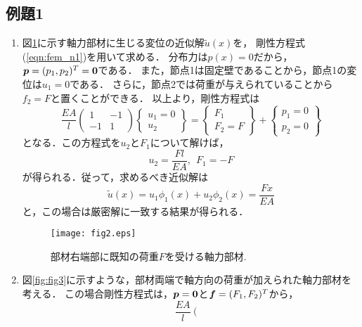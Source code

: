 \documentclass[10pt,a4j]{jarticle}
\begin{document}
\subsection{例題1}
\begin{enumerate}
\item
図\ref{fig:fig2}に示す軸力部材に生じる変位の近似解$\tilde u(x)$を，
剛性方程式(\ref{eqn:fem_n1})を用いて求める．
分布力は$p(x)=0$だから，$\mbox{\boldmath $p$}=(p_1,p_2)^T=\mbox{\boldmath $0$}$である．
また，節点1は固定壁であることから，節点1の変位は$u_1=0$である．
さらに，節点2では荷重が与えられていることから$f_2=F$と置くことができる．
以上より，剛性方程式は
\begin{equation}
	\frac{EA}{l}
	\left(
	\begin{array}{cc}
		1 & -1 \\
		-1 & 1
	\end{array}
	\right)
	\left\{
	\begin{array}{c}
		u_1=0 \\
		u_2
	\end{array}
	\right\}
	=
	\left\{
	\begin{array}{c}
		F_1\\
		F_2=F
	\end{array}
	\right\}
	+
	\left\{
	\begin{array}{c}
		p_1=0\\
		p_2=0
	\end{array}
	\right\}
\end{equation}
となる．この方程式を$u_2$と$F_1$について解けば，
\begin{equation}
	u_2=\frac{Fl}{EA}, \ \ F_1=-F
	\label{eqn:}
\end{equation}
が得られる．従って，求めるべき近似解は
\begin{equation}
	\tilde u(x)=u_1\phi_1(x)+u_2\phi_2(x)=\frac{Fx}{EA}
	\label{eqn:apprx1}
\end{equation}
と，この場合は厳密解に一致する結果が得られる．
\begin{figure}[h]
	\begin{center}
	\texttt{[image: fig2.eps]} 
	\end{center}
	\caption{部材右端部に既知の荷重$F$を受ける軸力部材.} 
	\label{fig:fig2}
\end{figure}
\item
図\ref{fig:fig3}に示すような，部材両端で軸方向の荷重が加えられた軸力部材を考える．
この場合剛性方程式は，$\mbox{\boldmath $p$}=\mbox{\boldmath $0$}$と$\mbox{\boldmath $f$}=(F_1,F_2)^T$から，
\begin{equation}
	\frac{EA}{l}
	\left(
	\begin{array}{cc}

\end{array}
\end{equation}
\end{enumerate}
\end{document}
